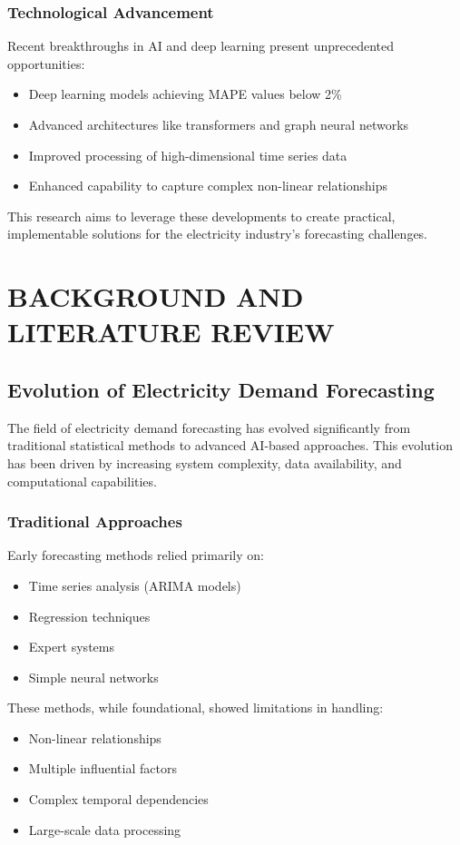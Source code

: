 \documentclass[12pt,a4paper]{report}
\begin{document}
\subsection{Technological Advancement}
Recent breakthroughs in AI and deep learning present unprecedented opportunities:
\begin{itemize}
\item Deep learning models achieving MAPE values below 2\%
\item Advanced architectures like transformers and graph neural networks
\item Improved processing of high-dimensional time series data
\item Enhanced capability to capture complex non-linear relationships
\end{itemize}

This research aims to leverage these developments to create practical, implementable solutions for the electricity industry's forecasting challenges. 

\chapter{BACKGROUND AND LITERATURE REVIEW}
\section{Evolution of Electricity Demand Forecasting}
The field of electricity demand forecasting has evolved significantly from traditional statistical methods to advanced AI-based approaches. This evolution has been driven by increasing system complexity, data availability, and computational capabilities.

\subsection{Traditional Approaches}
Early forecasting methods relied primarily on:
\begin{itemize}
\item Time series analysis (ARIMA models)
\item Regression techniques
\item Expert systems
\item Simple neural networks
\end{itemize}

These methods, while foundational, showed limitations in handling:
\begin{itemize}
\item Non-linear relationships
\item Multiple influential factors
\item Complex temporal dependencies
\item Large-scale data processing
\end{itemize}
\end{document}
